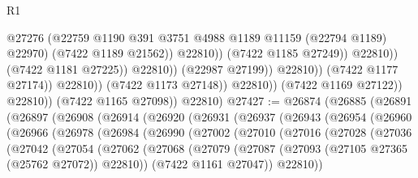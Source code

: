 \begin{lexlean}{R1}
\begin{coremodule}
                                                  @27276
                                                  (@22759
                                                    @1190
                                                    @391
                                                    @3751
                                                    @4988
                                                    @1189
                                                    @11159
                                                    (@22794 @1189)
                                                    @22970)
                                                  (@7422 @1189 @21562))
                                                @22810))
                                            (@7422 @1185 @27249))
                                          @22810))
                                      (@7422 @1181 @27225))
                                    @22810))
                                (@22987 @27199))
                              @22810))
                          (@7422 @1177 @27174))
                        @22810))
                    (@7422 @1173 @27148))
                  @22810))
              (@7422 @1169 @27122))
            @22810))
        (@7422 @1165 @27098))
      @22810)
@27427 := @26874
    (@26885
      (@26891
        (@26897
          (@26908
            (@26914
              (@26920
                (@26931
                  (@26937
                    (@26943
                      (@26954
                        (@26960
                          (@26966
                            (@26978
                              (@26984
                                (@26990
                                  (@27002
                                    (@27010
                                      (@27016
                                        (@27028
                                          (@27036
                                            (@27042
                                              (@27054
                                                (@27062
                                                  (@27068
                                                    (@27079
                                                      (@27087
                                                        (@27093
                                                          (@27105 @27365 (@25762 @27072))
                                                          @22810))
                                                      (@7422 @1161 @27047))
                                                    @22810))

\end{coremodule}
\end{lexlean}

